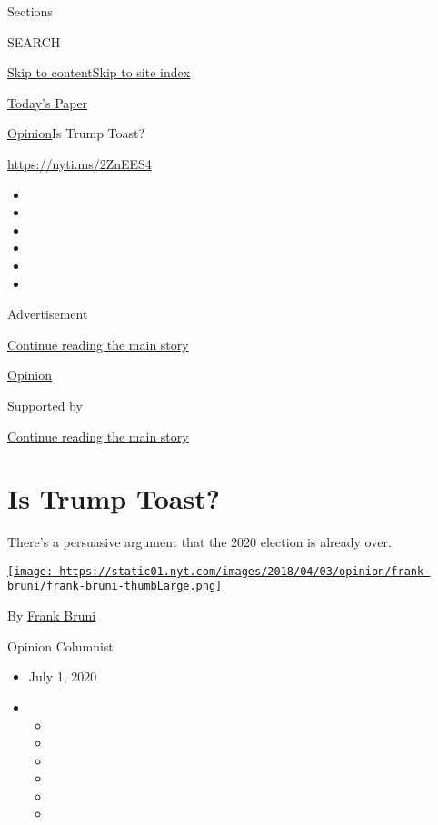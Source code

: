 Sections

SEARCH

\protect\hyperlink{site-content}{Skip to
content}\protect\hyperlink{site-index}{Skip to site index}

\href{https://myaccount.nytimes.com/auth/login?response_type=cookie\&client_id=vi}{}

\href{https://www.nytimes.com/section/todayspaper}{Today's Paper}

\href{/section/opinion}{Opinion}\textbar{}Is Trump Toast?

\href{https://nyti.ms/2ZnEES4}{https://nyti.ms/2ZnEES4}

\begin{itemize}
\item
\item
\item
\item
\item
\item
\end{itemize}

Advertisement

\protect\hyperlink{after-top}{Continue reading the main story}

\href{/section/opinion}{Opinion}

Supported by

\protect\hyperlink{after-sponsor}{Continue reading the main story}

\hypertarget{is-trump-toast}{%
\section{Is Trump Toast?}\label{is-trump-toast}}

There's a persuasive argument that the 2020 election is already over.

\href{https://www.nytimes.com/by/frank-bruni}{\texttt{[image: https://static01.nyt.com/images/2018/04/03/opinion/frank-bruni/frank-bruni-thumbLarge.png]}}

By \href{https://www.nytimes.com/by/frank-bruni}{Frank Bruni}

Opinion Columnist

\begin{itemize}
\item
  July 1, 2020
\item
  \begin{itemize}
  \item
  \item
  \item
  \item
  \item
  \item
  \end{itemize}
\end{itemize}

